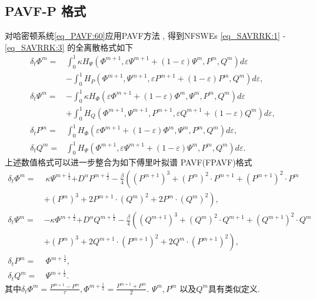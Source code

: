 \subsection{PAVF-P 格式}
对哈密顿系统\eqref{eq_PAVF:60}应用PAVF方法 , 得到NFSWEs \eqref{eq_SAVRRK:1} - \eqref{eq_SAVRRK:3} 的全离散格式如下
\begin{align}
\delta_{t} \varPhi^{m}=&\int_{0}^{1}\kappa H_{\Psi}\left(\varPhi^{m+1} , \varepsilon \Psi^{m+1}+(1-\varepsilon) \Psi^{m} , P^{m} , Q^{m}\right)d \varepsilon\nonumber\\
&-\int_{0}^{1}H_{P}\left(\varPhi^{m+1} , \Psi^{m+1} , \varepsilon P^{m+1}+(1-\varepsilon) P^{m} , Q^{m}\right)d \varepsilon , \label{eq_PAVF:70}\\
\delta_{t} \Psi^{m}=&-\int_{0}^{1}\kappa H_{\varPhi}\left(\varepsilon \varPhi^{m+1}+(1-\varepsilon) \varPhi^{m} , \Psi^{m} , P^{m} , Q^{m}\right)d \varepsilon\nonumber\\
&+\int_{0}^{1}H_{Q}\left(\varPhi^{m+1} , \Psi^{m+1} , P^{m+1} , \varepsilon Q^{m+1}+(1-\varepsilon) Q^{m}\right)d\varepsilon , \label{eq_PAVF:71}\\
\delta_{t} P^{m}=&\int_{0}^{1}H_{\varPhi}\left(\varepsilon \varPhi^{m+1}+(1-\varepsilon) \varPhi^{m} , \Psi^{m} , P^{m} , Q^{m}\right) d \varepsilon , \label{eq_PAVF:72}\\
\delta_{t} Q^{m}=&\int_{0}^{1}H_{\Psi}\left(\varPhi^{m+1} , \varepsilon \Psi^{m+1}+(1-\varepsilon) \Psi^{m} , P^{m} , Q^{m}\right) d \varepsilon . \label{eq_PAVF:73}
\end{align}
上述数值格式可以进一步整合为如下傅里叶拟谱 PAVF(FPAVF)格式
\begin{align}
\delta_{t} \varPhi^{m}=&~\kappa \Psi^{m+\frac{1}{2}}{+D^{\alpha} P^{m+\frac{1}{2}}}-\frac{\beta}{4}\left( (P^{m+1})^3+ (P^{m})^{2}\cdot P^{m+1}+(P^{m+1})^{2}\cdot P^{m}\right . \nonumber\\
	&+\left . (P^{m})^{3}+2 P^{m+1}\cdot (Q^{m})^{2}+2 P^{m}\cdot (Q^{m})^{2}\right) , \label{eq_PAVF:74}\\
\delta_{t} \Psi^{m}=&-\kappa \varPhi^{m+\frac{1}{2}}{+D^{\alpha} Q^{m+\frac{1}{2}}}-\frac{\beta}{4}\left( (Q^{m+1})^3+ (Q^{m})^{2}\cdot Q^{m+1}+(Q^{m+1})^{2}\cdot Q^{m}\right . \nonumber\\
	&+\left . (P^{m})^{3}+2 Q^{m+1}\cdot (P^{m+1})^{2}+2 Q^{m}\cdot (P^{m+1})^{2}\right) , \label{eq_PAVF:75}\\
\delta_{t} P^{m}=&~\varPhi^{m+\frac{1}{2}} , \label{eq_PAVF:76}\\
\delta_{t} Q^{m}=&~\Psi^{m+\frac{1}{2}} . \label{eq_PAVF:77}
\end{align}
其中$\delta_{t} \varPhi^{m} = \frac{P^{m+1}-P^{m}}{\tau}, \varPhi^{m+\frac{1}{2}} = \frac{P^{m+1}+P^{m}}{2}$. $\Psi^{m}, P^{m}$ 以及$Q^{m}$具有类似定义.

